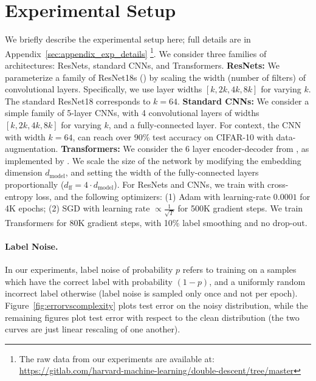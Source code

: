 \section{Experimental Setup}


We briefly describe the experimental setup here; full details are in Appendix~\ref{sec:appendix_exp_details}
\footnote{The raw data from our experiments
are available at:
\url{https://gitlab.com/harvard-machine-learning/double-descent/tree/master}}.
We consider three families of architectures: ResNets, standard CNNs, and Transformers.
\textbf{ResNets:}
We parameterize a family of ResNet18s (\cite{he2016identity})
by scaling the width (number of filters) of convolutional layers.
Specifically, we use layer widths $[k, 2k, 4k, 8k]$ for varying $k$.
The standard ResNet18 corresponds to $k=64$.
\textbf{Standard CNNs:}
We consider a simple family of 5-layer CNNs, with 4 convolutional layers of widths $[k, 2k, 4k, 8k]$ for varying $k$, and a fully-connected layer. For context, the CNN with width $k=64$, can reach over $90\%$ test accuracy on CIFAR-10 with data-augmentation.
\textbf{Transformers:}
We consider the 6 layer encoder-decoder from \cite{Vaswani},
as implemented by \cite{ott2019fairseq}.
We scale the size of the network by
modifying the embedding dimension $d_{\text{model}}$,
and setting the width of the fully-connected layers proportionally
($d_{\text{ff}} = 4\cdot d_{\text{model}}$).
For ResNets and CNNs, we train with cross-entropy loss, and the following optimizers:
(1) Adam with learning-rate $0.0001$ for 4K epochs; (2) SGD with learning rate $\propto \frac{1}{\sqrt{T}}$ for 500K gradient steps.
We train Transformers for 80K gradient steps, with 10\% label smoothing and no drop-out.

\paragraph{Label Noise.}
In our experiments, label noise of probability $p$ refers to
training on a samples which have the correct label
with probability $(1-p)$, and a uniformly random incorrect label otherwise (label noise is sampled only once and not per epoch).
Figure~\ref{fig:errorvscomplexity} plots test error on the noisy distribution, while the remaining figures plot test error with respect to the clean distribution (the two curves are just linear rescaling of one another).